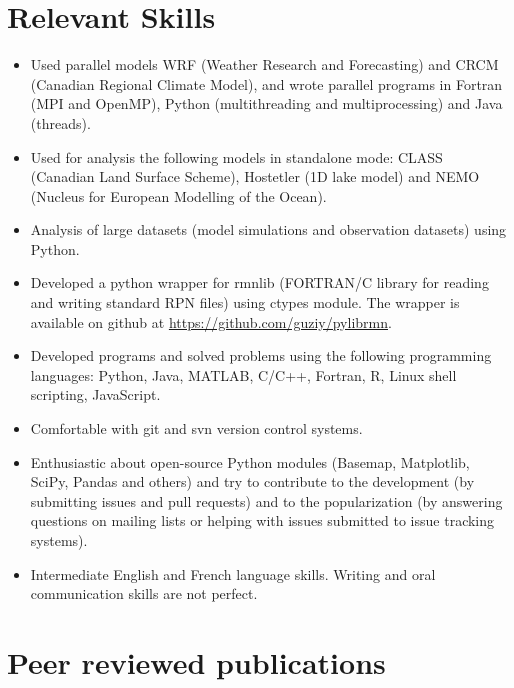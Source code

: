 \documentclass[12pt,a4paper,sans]{moderncv}
\newcommand{\vertspace}{1em}
\begin{document}
\section{Relevant Skills}
\vspace{\vertspace}
\begin{itemize}

  \item Used parallel models WRF (Weather Research and Forecasting) and CRCM
  (Canadian Regional Climate Model), and wrote parallel programs in Fortran
  (MPI and OpenMP), Python (multithreading and multiprocessing) and Java (threads).

  \item Used for analysis the following models in standalone mode: CLASS (Canadian Land Surface Scheme), Hostetler (1D lake model) and NEMO (Nucleus for European Modelling of the Ocean).

  \item Analysis of large datasets (model simulations and observation datasets) using Python.

  \item Developed a python wrapper for rmnlib (FORTRAN/C library for reading and writing standard RPN files) using ctypes module. The wrapper is available on github at \href{https://github.com/guziy/pylibrmn}{https://github.com/guziy/pylibrmn}.

  \item Developed programs and solved problems using the following programming languages: Python, Java, MATLAB, C/C++, Fortran, R, Linux shell scripting, JavaScript.

  \item Comfortable with git and svn version control systems.

  \item Enthusiastic about open-source Python modules (Basemap, Matplotlib,
  SciPy, Pandas and others) and try to contribute to the development (by
  submitting issues and pull requests) and to the popularization (by answering
  questions on mailing lists or helping with issues submitted to
  issue tracking systems).

  \item Intermediate English and French language skills. Writing and oral communication skills are not perfect.

\end{itemize}


\section*{Peer reviewed publications}

\end{document}
